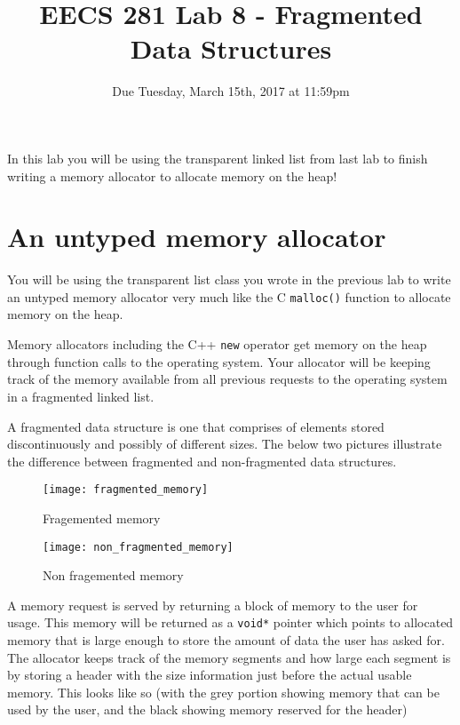 \documentclass{article}
\begin{document}
\title{\textbf{EECS 281 Lab 8 - Fragmented Data Structures}}
\author{Due Tuesday, March 15th, 2017 at 11:59pm}
\date{}
\maketitle
{}
{
   \pagestyle{empty}
}
\thispagestyle{firststyle}

In this lab you will be using the transparent linked list from last lab to
finish writing a memory allocator to allocate memory on the heap!

\section{An untyped memory allocator}
You will be using the transparent list class you wrote in the previous lab to
write an untyped memory allocator very much like the C \texttt{malloc()}
function to allocate memory on the heap.

Memory allocators including the C++ \texttt{new} operator get memory on the
heap through function calls to the operating system.  Your allocator will be
keeping track of the memory available from all previous requests to the
operating system in a fragmented linked list.

A fragmented data structure is one that comprises of elements stored
discontinuously and possibly of different sizes.  The below two pictures
illustrate the difference between fragmented and non-fragmented data
structures.

\begin{figure}[!htb]
\centering
\texttt{[image: fragmented\_memory]}
\caption{Fragemented memory}
\end{figure}

\begin{figure}[!htb]
\centering
\texttt{[image: non\_fragmented\_memory]}
\caption{Non fragemented memory}
\end{figure}

A memory request is served by returning a block of memory to the user for
usage.  This memory will be returned as a \texttt{void*} pointer which points
to allocated memory that is large enough to store the amount of data the user
has asked for.  The allocator keeps track of the memory segments and how large
each segment is by storing a header with the size information just before the
actual usable memory.  This looks like so (with the grey portion showing
memory that can be used by the user, and the black showing memory reserved for
the header)
\end{document}
